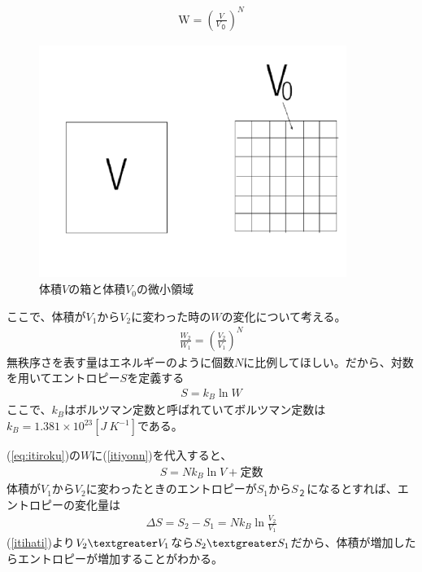 \begin{align}
  \mathrm{W} =\left(\frac{V}{V_０}\right)^N  \label{itiyonn}
\end{align}
\begin{figure}[H]
  \centering
  \includegraphics[width=10cm]{nishimura/image/2017112202.png}
  \caption{体積$V$の箱と体積$V_0$の微小領域}
  \label{fig:V}
\end{figure}
ここで、体積が$V_1$から$V_2$に変わった時の$W$の変化について考える。
\begin{align}
  \frac{W_2}{W_1}=\left(\frac{V_2}{V_1}\right)^N
\end{align}
無秩序さを表す量はエネルギーのように個数$N$に比例してほしい。だから、対数を用いてエントロピー$S$を定義する
\begin{align}
  S=k_B \ln{W} \label{eq:itiroku}
\end{align}
ここで、$k_B$はボルツマン定数と呼ばれていてボルツマン定数は$k_B=1.381×10^{23}[J\ K^{-1}]$である。\par
(\ref{eq:itiroku})の$W$に(\ref{itiyonn})を代入すると、
\begin{align}
  S=N k_B \ln{V}+定数  \label{snkb}
\end{align}
体積が$V_1$から$V_2$に変わったときのエントロピーが$S_1$から$S_２$になるとすれば、エントロピーの変化量は
\begin{align}
 \Delta S=S_2-S_1=N k_B \ln{\frac{V_2}{V_1}}  \label{itihati}
\end{align}
(\ref{itihati})より$V_2\textgreater V_1$なら$S_2\textgreater S_1$だから、体積が増加したらエントロピーが増加することがわかる。
